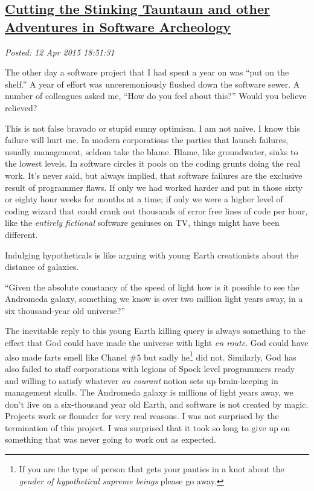 %

\subsection*{\href{https://bakerjd99.wordpress.com/2015/04/12/cutting-the-stinking-tauntaun-and-other-adventures-in-software-archeology/}{Cutting the Stinking Tauntaun and other Adventures in Software Archeology}}


\noindent\emph{Posted: 12 Apr 2015 18:51:31}
\vspace{6pt}

The other day a software project that I had spent a year on was ``put on
the shelf.'' A year of effort was unceremoniously flushed down the
software sewer. A number of colleagues asked me, ``How do you feel
about this?'' Would you believe relieved?

This is not false bravado or stupid sunny optimism. I am not naive. I
know this failure will hurt me. In modern corporations the parties that
launch failures, usually management, seldom take the blame. Blame, like
groundwater, sinks to the lowest levels. In software circles it pools on
the coding grunts doing the real work. It's never said, but always
implied, that software failures are the exclusive result of programmer
flaws. If only we had worked harder and put in those sixty or eighty
hour weeks for months at a time; if only we were a higher level of
coding wizard that could crank out thousands of error free lines of code
per hour, like the \emph{entirely fictional} software geniuses on TV,
things might have been different.

Indulging hypotheticals is like arguing with young Earth creationists
about the distance of galaxies.

``Given the absolute constancy of the speed of light how is it possible
to see the Andromeda galaxy, something we know is over two million light
years away, in a six thousand-year old universe?''

The inevitable reply to this young Earth killing query is always
something to the effect that God could have made the universe with light
\emph{en route}. God could have also made farts smell like Chanel \#5
but sadly he\footnote{If you are the type of person that gets
your panties in a knot about the \emph{gender of hypothetical supreme
 beings} please go away.
} did not. Similarly, God has
also failed to staff corporations with legions of Spock level
programmers ready and willing to satisfy whatever \emph{au courant}
notion sets up brain-keeping in management skulls. The Andromeda galaxy
is millions of light years away, we don't live on a six-thousand year
old Earth, and software is not created by magic. Projects work or
flounder for very real reasons. I was not surprised by the termination
of this project. I was surprised that it took so long to give up on
something that was never going to work out as expected.

